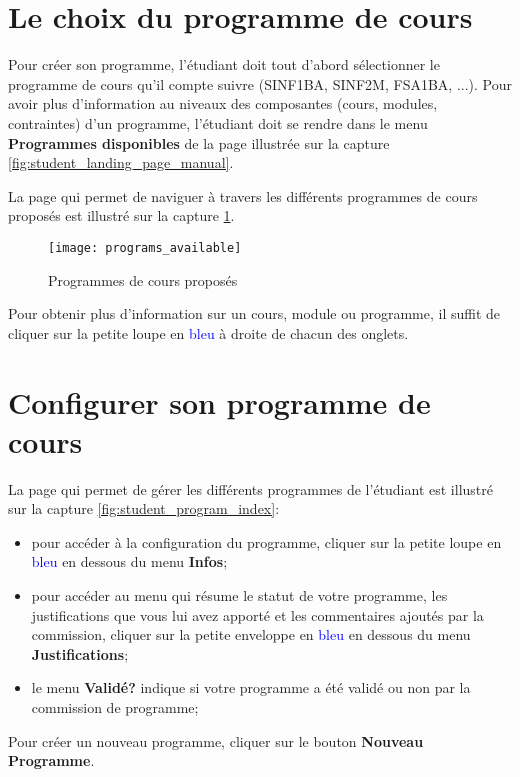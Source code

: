 \section{Le choix du programme de cours}
Pour créer son programme, l'étudiant doit tout d'abord sélectionner le programme de cours qu'il compte suivre (SINF1BA, SINF2M, FSA1BA, ...). Pour avoir plus d'information au niveaux des composantes (cours, modules, contraintes) d'un programme, l'étudiant doit se rendre dans le menu \textbf{Programmes disponibles} de la page illustrée sur la capture \ref{fig:student_landing_page_manual}. 

La page qui permet de naviguer à travers les différents programmes de cours proposés est illustré sur la capture \ref{fig:programs_availables}.

\begin{figure}[htb]
\centering
\caption{Programmes de cours proposés}
\label{fig:programs_availables}
\texttt{[image: programs\_available]}
\end{figure}

Pour obtenir plus d'information sur un cours, module ou programme, il suffit de cliquer sur la petite loupe en \textcolor{blue}{bleu} à droite de chacun des onglets. 

\section{Configurer son programme de cours}

La page qui permet de gérer les différents programmes de l'étudiant est illustré sur la capture \ref{fig:student_program_index}:

\begin{itemize}
\item pour accéder à la configuration du programme, cliquer sur la petite loupe en \textcolor{blue}{bleu} en dessous du menu \textbf{Infos};
\item pour accéder au menu qui résume le statut de votre programme, les justifications que vous lui avez apporté et les commentaires ajoutés par la commission, cliquer sur la petite enveloppe en \textcolor{blue}{bleu} en dessous du menu \textbf{Justifications};
\item le menu \textbf{Validé?} indique si votre programme a été validé ou non par la commission de programme;
\end{itemize}

Pour créer un nouveau programme, cliquer sur le bouton \textbf{Nouveau Programme}.


